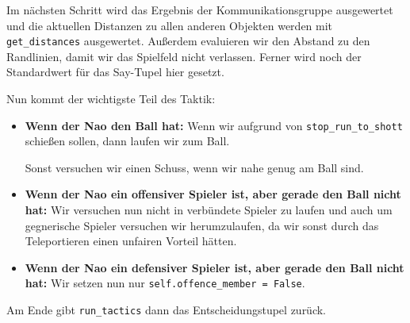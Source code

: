 Im nächsten Schritt wird das Ergebnis der Kommunikationsgruppe ausgewertet und die aktuellen Distanzen zu allen anderen Objekten werden mit \texttt{get\_distances} ausgewertet. Außerdem evaluieren wir den Abstand zu den Randlinien, damit wir das Spielfeld nicht verlassen. Ferner wird noch der Standardwert für das Say-Tupel hier gesetzt. 

Nun kommt der wichtigste Teil des Taktik:

\begin{itemize}
\item \textbf{Wenn der Nao den Ball hat: }
Wenn wir aufgrund von \texttt{stop\_run\_to\_shott} schießen sollen, dann laufen wir zum Ball.

Sonst versuchen wir einen Schuss, wenn wir nahe genug am Ball sind.
\item \textbf{Wenn der Nao ein offensiver Spieler ist, aber gerade den Ball nicht hat: }
Wir versuchen nun nicht in verbündete Spieler zu laufen und auch um gegnerische Spieler versuchen wir herumzulaufen, da wir sonst durch das Teleportieren einen unfairen Vorteil hätten. 
\item \textbf{Wenn der Nao ein defensiver Spieler ist, aber gerade den Ball nicht hat: }
Wir setzen nun nur \texttt{self.offence\_member = False}.
\end{itemize}

Am Ende gibt \texttt{run\_tactics} dann das \glqq Entscheidungstupel \grqq zurück.

